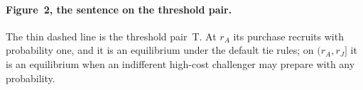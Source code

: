 \paragraph{Figure~2, the sentence on the threshold pair.}
The thin dashed line is the threshold pair~T. At \(r_A\) its purchase recruits with probability one, and it is an
equilibrium under the default tie rules; on \((r_A,r_J]\) it is an equilibrium when an indifferent high-cost challenger
may prepare with any probability.


